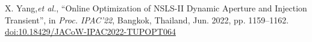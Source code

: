 \documentclass[a4paper,
               keeplastbox,   %
               ]{jacow}
\begin{document}
\begin{thebibliography}{9}
        X. Yang,\emph{et al.},
       \textquotedblleft{Online Optimization of NSLS-II Dynamic Aperture and Injection Transient}\textquotedblright,
        in \emph{Proc. IPAC'22}, Bangkok, Thailand, Jun. 2022, pp. 1159--1162.
       \url{doi:10.18429/JACoW-IPAC2022-TUPOPT064}
    
   
	\end{thebibliography}

%
% 

%
\end{document}
